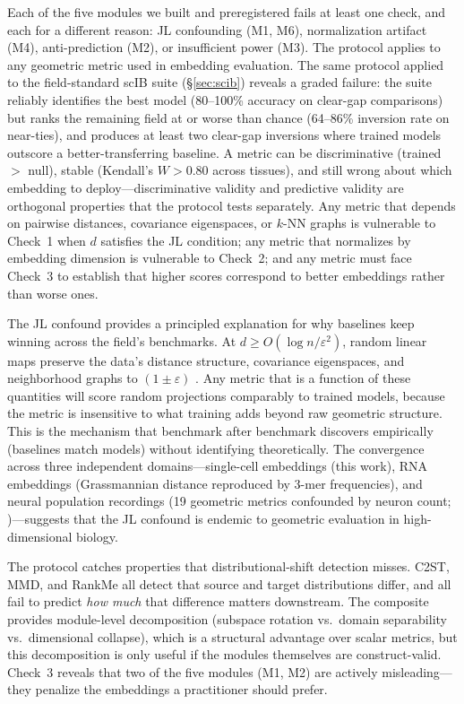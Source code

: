 \documentclass[10pt,letterpaper]{article}
\begin{document}
Each of the five modules we built and preregistered fails at least one check, and each for a different reason: JL confounding (M1, M6), normalization artifact (M4), anti-prediction (M2), or insufficient power (M3). The protocol applies to any geometric metric used in embedding evaluation. The same protocol applied to the field-standard scIB suite (\S\ref{sec:scib}) reveals a graded failure: the suite reliably identifies the best model (80--100\% accuracy on clear-gap comparisons) but ranks the remaining field at or worse than chance (64--86\% inversion rate on near-ties), and produces at least two clear-gap inversions where trained models outscore a better-transferring baseline. A metric can be discriminative (trained $>$ null), stable (Kendall's $W > 0.80$ across tissues), and still wrong about which embedding to deploy---discriminative validity and predictive validity are orthogonal properties that the protocol tests separately. Any metric that depends on pairwise distances, covariance eigenspaces, or $k$-NN graphs is vulnerable to Check~1 when $d$ satisfies the JL condition; any metric that normalizes by embedding dimension is vulnerable to Check~2; and any metric must face Check~3 to establish that higher scores correspond to better embeddings rather than worse ones.

The JL confound provides a principled explanation for why baselines keep winning across the field's benchmarks. At $d \geq O(\log n / \varepsilon^2)$, random linear maps preserve the data's distance structure, covariance eigenspaces, and neighborhood graphs to $(1 \pm \varepsilon)$ \citep{johnsonlindenstrauss1984}. Any metric that is a function of these quantities will score random projections comparably to trained models, because the metric is insensitive to what training adds beyond raw geometric structure. This is the mechanism that benchmark after benchmark discovers empirically (baselines match models) without identifying theoretically. The convergence across three independent domains---single-cell embeddings (this work), RNA embeddings (Grassmannian distance reproduced by 3-mer frequencies), and neural population recordings (19 geometric metrics confounded by neuron count; \citealp{tower2026bracket})---suggests that the JL confound is endemic to geometric evaluation in high-dimensional biology.

The protocol catches properties that distributional-shift detection misses. C2ST, MMD, and RankMe all detect that source and target distributions differ, and all fail to predict \emph{how much} that difference matters downstream. The composite provides module-level decomposition (subspace rotation vs.\ domain separability vs.\ dimensional collapse), which is a structural advantage over scalar metrics, but this decomposition is only useful if the modules themselves are construct-valid. Check~3 reveals that two of the five modules (M1, M2) are actively misleading---they penalize the embeddings a practitioner should prefer.
\end{document}
